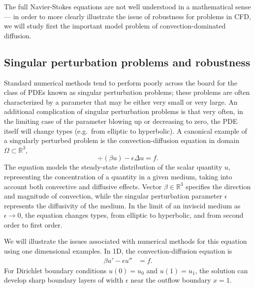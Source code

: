 The full Navier-Stokes equations are not well understood in a mathematical sense --- in order to more clearly illustrate the issue of robustness for problems in CFD, we will study first the important model problem of convection-dominated diffusion.  

\subsection{Singular perturbation problems and robustness}


Standard numerical methods tend to perform poorly across the board for the class of PDEs known as singular perturbation problems; these problems are often characterized by a parameter that may be either very small or very large.  An additional complication of singular perturbation problems is that very often, in the limiting case of the parameter blowing up or decreasing to zero, the PDE itself will change types (e.g.\ from elliptic to hyperbolic).  A canonical example of a singularly perturbed problem is the convection-diffusion equation in domain $\Omega \subset \mathbb{R}^3$,
\[
\div \left(\beta u\right) - \epsilon \Delta u = f.
\]
The equation models the steady-state distribution of the scalar quantity $u$, representing the concentration of a quantity in a given medium, taking into account both convective and diffusive effects. Vector $\beta \in \mathbb{R}^3$ specifies the direction and magnitude of convection, while the singular perturbation parameter $\epsilon$ represents the diffusivity of the medium. In the limit of an inviscid medium as $\epsilon\rightarrow 0$, the equation changes types, from elliptic to hyperbolic, and from second order to first order.

We will illustrate the issues associated with numerical methods for this equation using one dimensional examples.  In 1D, the convection-diffusion equation is
\begin{align*}
\beta u'-\epsilon u'' &= f.
\end{align*}
For Dirichlet boundary conditions $u(0)=u_0$ and $u(1)= u_1$, the solution can develop sharp boundary layers of width $\epsilon$ near the outflow boundary $x=1$. 

